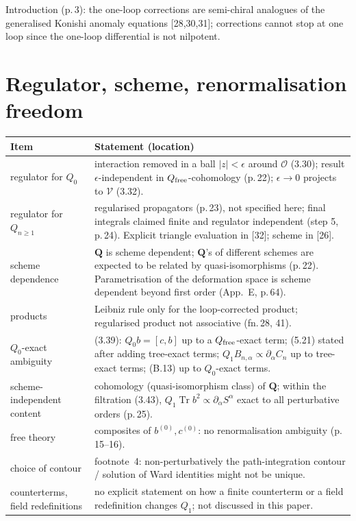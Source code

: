 \documentclass[11pt]{article}
\newcommand{\Tr}{\operatorname{Tr}}
\newcommand{\cO}{\mathcal{O}}
\newcommand{\bQ}{\mathbf{Q}}
\begin{document}
Introduction (p.\,3): the one-loop corrections are semi-chiral analogues of the generalised Konishi anomaly equations [28,30,31]; corrections cannot stop at one loop since the one-loop differential is not nilpotent.

\section{Regulator, scheme, renormalisation freedom}

\begin{longtable}{p{}p{}}
\textbf{Item} & \textbf{Statement (location)}\\\hline
regulator for $Q_0$ & interaction removed in a ball $|z|<\epsilon$ around $\cO$ (3.30); result $\epsilon$-independent in $Q_{\rm free}$-cohomology (p.\,22); $\epsilon\to0$ projects to $\mathcal V$ (3.32).\\
regulator for $Q_{n\geq1}$ & regularised propagators (p.\,23), not specified here; final integrals claimed finite and regulator independent (step 5, p.\,24). Explicit triangle evaluation in [32]; scheme in [26].\\
scheme dependence & $\bQ$ is scheme dependent; $\bQ$'s of different schemes are expected to be related by quasi-isomorphisms (p.\,22). Parametrisation of the deformation space is scheme dependent beyond first order (App.~E, p.\,64).\\
products & Leibniz rule only for the loop-corrected product; regularised product not associative (fn.\,28, 41).\\
$Q_0$-exact ambiguity & (3.39): $Q_0b=[c,b]$ up to a $Q_{\rm free}$-exact term; (5.21) stated after adding tree-exact terms; $Q_1B_{n,\alpha}\propto\partial_\alpha C_n$ up to tree-exact terms; (B.13) up to $Q_0$-exact terms.\\
scheme-independent content & cohomology (quasi-isomorphism class) of $\bQ$; within the filtration (3.43), $Q_1\Tr b^2\propto\partial_\alpha S^\alpha$ exact to all perturbative orders (p.\,25).\\
free theory & composites of $b^{(0)},c^{(0)}$: no renormalisation ambiguity (p.\,15--16).\\
choice of contour & footnote~4: non-perturbatively the path-integration contour / solution of Ward identities might not be unique.\\
counterterms, field redefinitions & no explicit statement on how a finite counterterm or a field redefinition changes $Q_1$; not discussed in this paper.\\
\end{longtable}
\end{document}
